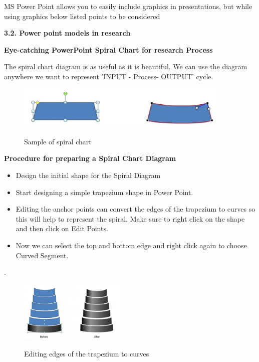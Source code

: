 MS Power Point allows you to easily include graphics in presentations, but while using graphics below listed points to be considered
	

\textbf{\textbf{3.2. Power point models in research}}

\textbf{Eye-catching PowerPoint Spiral Chart for research Process} \cite {Codeman Lisa}

The spiral chart diagram is as useful as it is beautiful. We can use the diagram anywhere we want to represent 'INPUT - Process- OUTPUT' cycle.


\begin{figure}
  \includegraphics[width=4in]{figure9.eps} \cite {  Stephen Moffat}
  \caption {Sample of spiral chart}\label{3.9}
\end{figure}





\textbf{Procedure for preparing a Spiral Chart Diagram}
\begin{itemize}
  \item Design the initial shape for the Spiral Diagram
  \item Start designing a simple trapezium shape in Power Point.
  \item Editing the anchor points can convert the edges of the trapezium to curves so this will help to represent the spiral. Make sure to right click on the shape and then click on Edit Points.

  \item Now we can select the top and bottom edge and right click again to choose Curved Segment. \cite {Stephen Moffat}
\end{itemize}
.	
\begin{figure}
  \includegraphics[width=2in]{figure10.eps} \cite { Stephen Moffat}
  \caption {Editing edges of the trapezium to curves}\label{3.10}
\end{figure}




